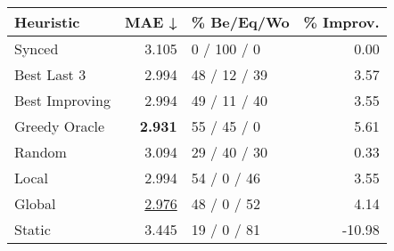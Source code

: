\begin{tabular}{lrlr}
\toprule
\textbf{Heuristic} & \textbf{MAE ↓} & \textbf{\% Be/Eq/Wo} & \textbf{\% Improv.} \\
\midrule
            Synced &          3.105 &          0 / 100 / 0 &                0.00 \\
\midrule
       Best Last 3 &          2.994 &         48 / 12 / 39 &                3.57 \\
    Best Improving &          2.994 &         49 / 11 / 40 &                3.55 \\
\addlinespace
     Greedy Oracle &          \textbf{2.931} &          55 / 45 / 0 &                5.61 \\
            Random &          3.094 &         29 / 40 / 30 &                0.33 \\
\midrule
             Local &          2.994 &          54 / 0 / 46 &                3.55 \\
            Global &          \underline{2.976} &          48 / 0 / 52 &                4.14 \\
\midrule
            Static &          3.445 &          19 / 0 / 81 &              -10.98 \\
\bottomrule
\end{tabular}

\label{tab:ds_non_lr05_le2_bs4_Summary}
